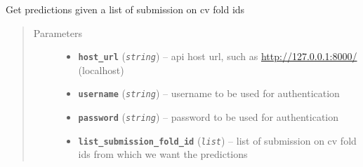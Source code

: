 \documentclass[letterpaper,10pt,english]{sphinxmanual}
\begin{document}
\begin{fulllineitems}
\label{modules/views:test_files.post_api.get_prediction_list}
Get predictions given a list of submission on cv fold ids
\begin{quote}\begin{description}
\item[{Parameters}] \leavevmode\begin{itemize}
\item {} 
\textbf{\texttt{host\_url}} (\emph{\texttt{string}}) -- api host url, such as \url{http://127.0.0.1:8000/} (localhost)

\item {} 
\textbf{\texttt{username}} (\emph{\texttt{string}}) -- username to be used for authentication

\item {} 
\textbf{\texttt{password}} (\emph{\texttt{string}}) -- password to be used for authentication

\item {} 
\textbf{\texttt{list\_submission\_fold\_id}} (\emph{\texttt{list}}) -- list of submission on cv fold ids from     which we want the predictions

\end{itemize}

\end{description}\end{quote}

\end{fulllineitems}

\end{document}
